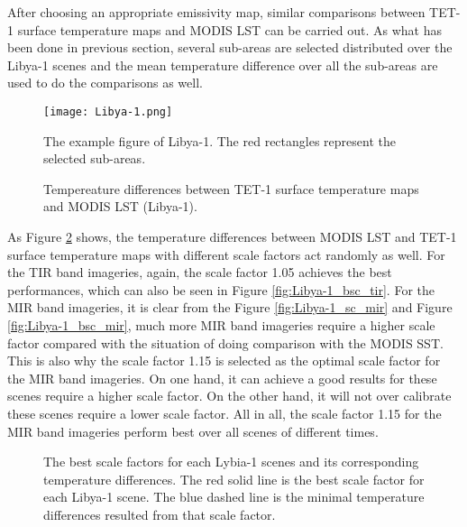 \noindent After choosing an appropriate emissivity map, similar comparisons between TET-1 surface temperature maps and MODIS LST can be carried out. As what has been done in previous section, several sub-areas are selected distributed over the Libya-1 scenes and the mean temperature difference over all the sub-areas are used to do the comparisons as well.\\

\begin{figure}[!htbp]
\centering
\texttt{[image: Libya-1.png]}
\caption{The example figure of Libya-1. The red rectangles represent the selected sub-areas.}
\label{fig:Libya1_sub_areas}
\end{figure}

\begin{figure}[!htbp]
\centering
{}
\hspace{0.5in}
\caption{Tempereature differences between TET-1 surface temperature maps and MODIS LST (Libya-1).}
\label{fig:Libya-1_sc_mir_tir}
\end{figure}

\noindent As Figure \ref{fig:Libya-1_sc_mir_tir} shows, the temperature differences between MODIS LST and TET-1 surface temperature maps with different scale factors act randomly as well. For the TIR band imageries, again, the scale factor 1.05 achieves the best performances, which can also be seen in Figure \ref{fig:Libya-1_bsc_tir}. For the MIR band imageries, it is clear from the Figure \ref{fig:Libya-1_sc_mir} and Figure \ref{fig:Libya-1_bsc_mir}, much more MIR band imageries require a higher scale factor compared with the situation of doing comparison with the MODIS SST. This is also why the scale factor 1.15 is selected as the optimal scale factor for the MIR band imageries. On one hand, it can achieve a good results for these scenes require a higher scale factor. On the other hand, it will not over calibrate these scenes require a lower scale factor. All in all, the scale factor 1.15 for the MIR band imageries perform best over all scenes of different times.\\

\begin{figure}[!htbp]
\centering
{}
\hspace{0.5in}
\caption{The best scale factors for each Lybia-1 scenes and its corresponding temperature differences. The red solid line is the best scale factor for each Libya-1 scene. The blue dashed line is the minimal temperature differences resulted from that scale factor.}
\label{fig:Libya-1_bsc_mir_tir}
\end{figure}

